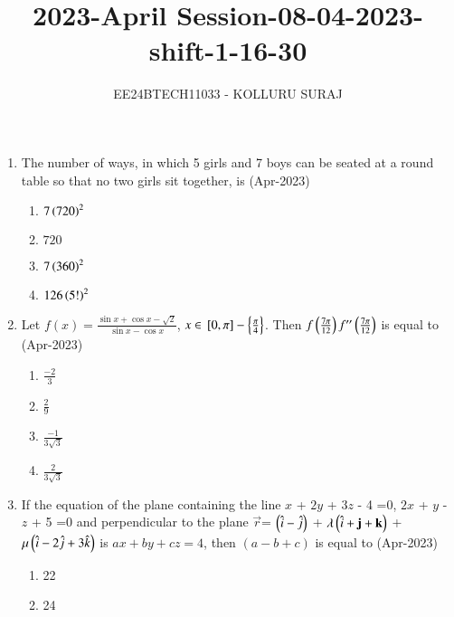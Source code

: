 \documentclass[journal]{IEEEtran}
\numberwithin{equation}{enumi}
\numberwithin{figure}{enumi}
\begin{document}

\title{2023-April Session-08-04-2023-shift-1-16-30}
\author{EE24BTECH11033 - KOLLURU SURAJ}
{\let\newpage\relax\maketitle}
\begin{enumerate}
\item The number of ways, in which 5 girls and 7 boys can be seated at a round table so that no two girls sit together, is
\hfill(Apr-2023)
\begin{multicols}{4}
    \begin{enumerate}
        \item $7\left(720\right)^2$
        \item $720$
        \item $7\left(360\right)^2$
        \item $126\left(5!\right)^2$
    \end{enumerate}
\end{multicols}
\item Let $f(x) = \frac{\sin x + \cos x - \sqrt{2}}{\sin x - \cos x}$, $x \in {}\left[0, \pi\right]-\left\{\frac{\pi}{4}\right\}$. Then $f\left(\frac{7\pi}{12}\right)f^{\prime\prime}\left(\frac{7\pi}{12}\right)$  is equal to
\hfill(Apr-2023)
\begin{multicols}{4}
    \begin{enumerate}
    \item $\frac{-2}{3}$
    \item $\frac{2}{9}$
    \item $\frac{-1}{3\sqrt3}$
    \item $\frac{2}{3\sqrt{3}}$
    \end{enumerate}
\end{multicols}
\item If the equation of the plane containing the line $x$ + $2y$ + $3z$ - 4 =0, $2x$ + $y$ - $z$ + 5 =0 and perpendicular to the plane $\vec{r}$= $\left(\hat{i}-\hat{j}\right)$ + $\lambda\left(\hat{i}+\mathbf{j}+\mathbf{k}\right)$ +$\mu\left(\hat{i}-2\hat{j}+3\hat{k}\right)$ is $ax + by+cz=4$, then $(a-b+c)$ is equal to
\hfill(Apr-2023)
\begin{multicols}{4}
    \begin{enumerate}
    \item 22
    \item 24

\end{enumerate}
\end{multicols}
\end{enumerate}
\end{document}
